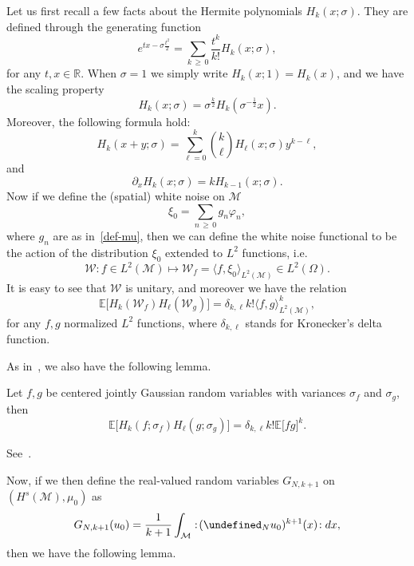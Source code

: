 \documentclass[AHL,Unicode,longabstracts,published]{cedram}
\newcommand{\R}{\mathbb{R}}
\newcommand{\E}{\mathbb{E}}
\let\P= \undefined
\newcommand{\P}{\mathbf{P}}
\newcommand{\M}{\mathcal{M}}
\newcommand{\dl}{\delta}
\newcommand{\s}{\sigma}
\newcommand{\dx}{\partial_x}
\newcommand{\W}{\mathcal{W}}
\renewcommand{\O}{\Omega}
\begin{document}
Let us first recall a few facts about the Hermite polynomials $H_k(x;\s)$. They are defined through the generating function
\begin{equation*}
e^{tx-\s\frac{t^2}{2}}=\sum_{k\,\geq\,0}\frac{t^k}{k!}H_k(x;\s),
\end{equation*}
for any $t,x\in\R$. When $\s=1$ we simply write $H_k(x;1)=H_k(x)$, and we have the scaling property
\begin{equation*}
H_k(x;\s)=\s^{\frac{k}{2}}H_k\left(\s^{-\frac12}x\right).
\end{equation*}
Moreover, the following formula hold:
\begin{equation}\label{Hsum}
H_k(x+y;\s) = \sum_{\ell=0}^k {\binom k \ell} H_{\ell}(x;\s)y^{k-\ell},
\end{equation}
and
\begin{equation}\label{Hdif}
\dx H_k(x;\s) = kH_{k-1}(x;\s).
\end{equation}
Now if we define the (spatial) white noise on $\M$
\begin{equation*}
\xi_0=\sum_{n\,\geq\,0}g_n\varphi_n,
\end{equation*}
where $g_n$ are as in~\eqref{def-mu}, then we can define the white noise functional to be the action of the distribution $\xi_0$ extended to $L^2$ functions, i.e.
\begin{equation*}
\W: f\in L^2(\M)\longmapsto \W_f = \langle f,\xi_0\rangle_{L^2(\M)}\in L^2(\O).
\end{equation*}
It is easy to see that $\W$ is unitary, and moreover we have the relation
\begin{equation}\label{WNF-perp}
\E\big[H_k(\W_f)H_{\ell}(\W_g)\big] = \dl_{k,\ell}k!\langle f,g\rangle_{L^2(\M)}^k,
\end{equation}
for any $f,g$ normalized $L^2$ functions, where $\dl_{k,\ell}$ stands for Kronecker's delta function.

As in~\cite{GKO}, we also have the following lemma.
\begin{lemm}
Let $f,g$ be centered jointly Gaussian random variables with variances $\s_f$ and $\s_g$, then
\begin{equation}\label{prod-wick}
\E\big[H_k\left(f;\s_f\right)H_{\ell}\left(g;\s_g\right)\big] = \delta_{k,\ell}k!\E\big[fg\big]^k.
\end{equation}
\end{lemm}
See~\cite[Lemma~1.1.1]{Nualart}.

Now, if we then define the real-valued random variables $G_{N,k+1}$ on $(H^s(\M),\mu_0)$ as
\begin{align*}
G_{N,k+1}(u_0) = \frac{1}{k+1}\int_{\M} :\! (\P_N u_0)^{k+1} (x)\!: dx,
\end{align*}
then we have the following lemma.
\end{document}
